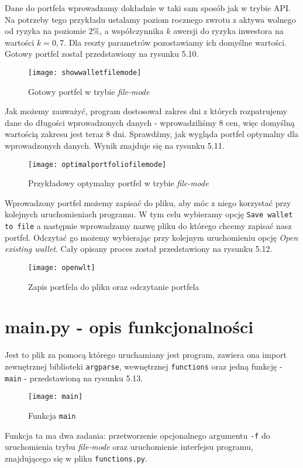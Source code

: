 \documentclass[magister]{dyplom}
\def\code#1{\texttt{#1}}
\begin{document}
\newpage
Dane do portfela wprowadzamy dokładnie w taki sam sposób jak w trybie API. Na potrzeby tego przykładu ustalamy poziom rocznego zwrotu z aktywa wolnego od ryzyka na poziomie $2 \%$, a współczynnika $k$ awersji do ryzyka inwestora na wartości $k=0,7$. Dla reszty parametrów pozostawiamy ich domyślne wartości. Gotowy portfel został przedstawiony na rysunku 5.10.

\begin{figure}[ht]
	\centering
	\texttt{[image: showwalletfilemode]}
	\caption{Gotowy portfel w trybie \textit{file-mode}}
\end{figure}
Jak możemy zauważyć, program dostosował zakres dni z których rozpatrujemy dane do długości wprowadzonych danych - wprowadziliśmy 8 cen, więc domyślną wartością zakresu jest teraz 8 dni.
Sprawdźmy, jak wygląda portfel optymalny dla wprowadzonych danych. Wynik znajduje się na rysunku 5.11.
\newpage
\begin{figure}[ht]
	\centering
	\texttt{[image: optimalportfoliofilemode]}
	\caption{Przykładowy optymalny portfel w trybie \textit{file-mode}}
\end{figure}

Wprowadzony portfel możemy zapisać do pliku, aby móc z niego korzystać przy kolejnych uruchomieniach programu. W tym celu wybieramy opcję \code{Save wallet to file} a następnie wprowadzamy nazwę pliku do którego chcemy zapisać nasz portfel. Odczytać go możemy wybierając przy kolejnym uruchomieniu opcję \textit{Open existing wallet}. Cały opisany proces został przedstawiony na rysunku 5.12.

\begin{figure}[h]
	\centering
	\texttt{[image: openwlt]}
	\caption{Zapis portfela do pliku oraz odczytanie portfela}
\end{figure}
\newpage
\section{main.py - opis funkcjonalności}
Jest to plik za pomocą którego uruchamiany jest program, zawiera ona import zewnętrznej biblioteki \code{argparse}, wewnętrznej \code{functions} oraz jedną funkcję - \code{main} - przedstawioną na rysunku 5.13.

\begin{figure}[ht]
	\centering
	\texttt{[image: main]}
	\caption{Funkcja \code{main}}
\end{figure}

Funkcja ta ma dwa zadania: przetworzenie opcjonalnego argumentu \code{-f} do uruchomienia trybu \textit{file-mode} oraz uruchomienie interfejsu programu, znajdującego się w pliku \code{functions.py}.\\
\end{document}
